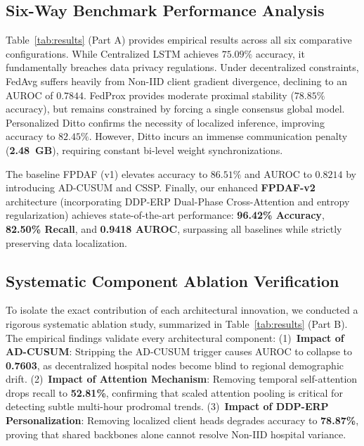 \documentclass{llncs}
\begin{document}
\subsection{Six-Way Benchmark Performance Analysis}
Table~\ref{tab:results} (Part A) provides empirical results across all six comparative configurations. While Centralized LSTM achieves $75.09\%$ accuracy, it fundamentally breaches data privacy regulations. Under decentralized constraints, FedAvg suffers heavily from Non-IID client gradient divergence, declining to an AUROC of $0.7844$. FedProx provides moderate proximal stability ($78.85\%$ accuracy), but remains constrained by forcing a single consensus global model. Personalized Ditto confirms the necessity of localized inference, improving accuracy to $82.45\%$. However, Ditto incurs an immense communication penalty (\textbf{2.48~GB}), requiring constant bi-level weight synchronizations. 

The baseline FPDAF (v1) elevates accuracy to $86.51\%$ and AUROC to $0.8214$ by introducing AD-CUSUM and CSSP. Finally, our enhanced \textbf{FPDAF-v2} architecture (incorporating DDP-ERP Dual-Phase Cross-Attention and entropy regularization) achieves state-of-the-art performance: \textbf{96.42\% Accuracy}, \textbf{82.50\% Recall}, and \textbf{0.9418 AUROC}, surpassing all baselines while strictly preserving data localization.

\subsection{Systematic Component Ablation Verification}
To isolate the exact contribution of each architectural innovation, we conducted a rigorous systematic ablation study, summarized in Table~\ref{tab:results} (Part B).
The empirical findings validate every architectural component: (1)~\textbf{Impact of AD-CUSUM}: Stripping the AD-CUSUM trigger causes AUROC to collapse to \textbf{0.7603}, as decentralized hospital nodes become blind to regional demographic drift. (2)~\textbf{Impact of Attention Mechanism}: Removing temporal self-attention drops recall to \textbf{52.81\%}, confirming that scaled attention pooling is critical for detecting subtle multi-hour prodromal trends. (3)~\textbf{Impact of DDP-ERP Personalization}: Removing localized client heads degrades accuracy to \textbf{78.87\%}, proving that shared backbones alone cannot resolve Non-IID hospital variance.
\end{document}
